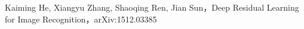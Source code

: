 \documentclass[openright,oneside]{ctexbook}	%
\begin{document}
\begin{thebibliography}{99}
Kaiming He, Xiangyu Zhang, Shaoqing Ren, Jian Sun，Deep Residual Learning for Image Recognition，arXiv:1512.03385

\end{thebibliography}
\end{document}
